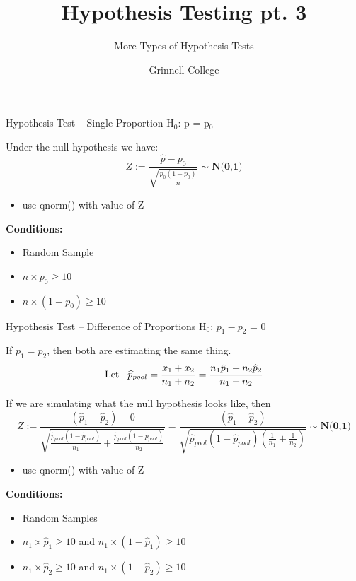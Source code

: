 \documentclass{beamer}
\title[Introduction to Statistics]{Hypothesis Testing pt. 3}
\subtitle{More Types of Hypothesis Tests}
\author{Grinnell College}
\date{}
\begin{document}
\begin{frame}
  \titlepage
\end{frame}

\begin{frame}{Hypothesis Test -- Single Proportion}
H$_0$: p = p$_0$ \vspace{4mm}

Under the null hypothesis we have:
\begin{equation*}
    Z := \frac{\hat{p} - p_0}{\sqrt{\frac{p_0(1-p_0)}{n}}} \sim \textbf{N(0,1)}
\end{equation*} \vspace{-4mm}
\begin{itemize}
    \item use qnorm() with value of Z
\end{itemize} \vspace{4mm}

\textbf{Conditions:}
\begin{itemize}
    \item Random Sample
    \item $n \times p_0 \geq 10$
    \item $n \times (1-p_0) \geq 10$
\end{itemize}
\end{frame}

\begin{frame}{Hypothesis Test -- Difference of Proportions}
H$_0$: $p_1 - p_2$ = 0 \vspace{4mm}

If $p_1 = p_2$, then both are estimating the same thing.
\begin{equation*}
    \text{Let} \hspace{3mm} \widehat{p}_{pool} = \frac{x_1 + x_2}{n_1 + n_2} = \frac{n_1\hat{p}_1 + n_2\hat{p}_2}{n_1 + n_2}
\end{equation*}

If we are simulating what the null hypothesis looks like, then
\begin{equation*}
    Z := \frac{(\hat{p}_1 - \hat{p}_2) - 0}{\sqrt{\frac{\widehat{p}_{pool}(1-\widehat{p}_{pool})}{n_1}+\frac{\widehat{p}_{pool}(1-\widehat{p}_{pool})}{n_2}}} = \frac{(\hat{p}_1 - \hat{p}_2)}{\sqrt{\widehat{p}_{pool}(1-\widehat{p}_{pool})(\frac{1}{n_1}+\frac{1}{n_2})}} \sim \textbf{N(0,1)}
\end{equation*} \vspace{-4mm}
\begin{itemize}
    \item use qnorm() with value of Z
\end{itemize}

\textbf{Conditions:}
\begin{itemize}
    \item Random Samples
    \item $n_1 \times \widehat{p}_1 \geq 10$ and $n_1 \times (1-\widehat{p}_1) \geq 10$
    \item $n_1 \times \widehat{p}_2 \geq 10$ and $n_1 \times (1-\widehat{p}_2) \geq 10$
\end{itemize}
\end{frame}
\end{document}
